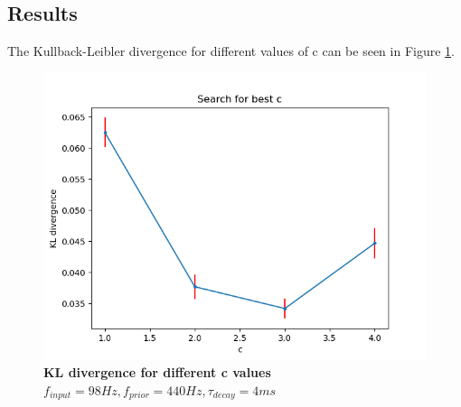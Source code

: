 \subsection{Results}

The Kullback-Leibler divergence for different values of c can be seen in Figure \ref{fig:1DTrainingC}.
\begin{figure}
  \includegraphics[width=\linewidth]{figures/1D/training/KLD_cvsfInput98_fPrior440tau4.png}
  \caption{\textbf{KL divergence for different c values} $f_{input} = 98 Hz, f_{prior} = 440 Hz, \tau_{decay} = 4 ms$}
  \label{fig:1DTrainingC}
\end{figure}

